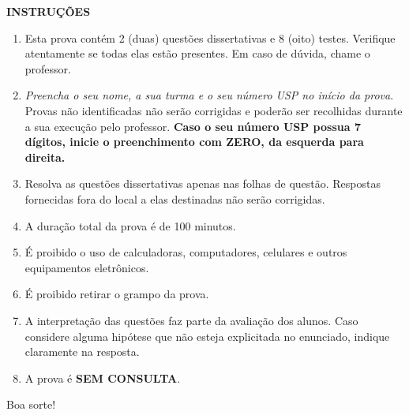 \centerline{\textbf{INSTRUÇÕES}}

\begin{enumerate}
	\item Esta prova contém 2 (duas) questões dissertativas e 8 (oito) testes. Verifique atentamente se todas elas estão presentes. Em caso de dúvida, chame o professor.
	\item \emph{Preencha o seu nome, a sua turma e o seu número USP no início da prova}. Provas não identificadas não serão corrigidas e poderão ser recolhidas durante a sua execução pelo professor.\textbf{ Caso o seu número USP possua 7 dígitos, inicie o preenchimento com ZERO, da esquerda para direita.}
	\item Resolva as questões dissertativas apenas nas folhas de questão. Respostas fornecidas fora do local a elas destinadas não serão corrigidas.
	\item A duração total da prova é de 100 minutos.
	\item É proibido o uso de calculadoras, computadores, celulares e outros equipamentos eletrônicos.
	\item É proibido retirar o grampo da prova.
	\item A interpretação das questões faz parte da avaliação dos alunos. Caso considere alguma hipótese que não esteja explicitada no enunciado, indique claramente na resposta.
	\item A prova é \textbf{SEM CONSULTA}.
\end{enumerate}

Boa sorte!\\

